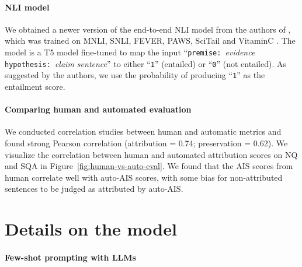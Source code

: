 \paragraph{NLI model} We obtained a newer version of the end-to-end NLI model from the authors of \citet{Honovich2022TRUERF}, which was trained on MNLI, SNLI, FEVER, PAWS, SciTail and VitaminC \cite{williams2017broad,bowman2015large,thorne2018fever,zhang2019paws,khot2018scitail,schuster2021get}.
The model is a T5 model fine-tuned to map the input ``\texttt{premise: }\textit{evidence}\texttt{ hypothesis:   }\textit{claim sentence}'' to either ``\texttt{1}'' (entailed) or ``\texttt{0}'' (not entailed). As suggested by the authors, we use the probability of producing ``\texttt{1}'' as the entailment score.



\paragraph{Comparing human and automated evaluation}
We conducted correlation studies between human and automatic metrics and found strong Pearson correlation (attribution = 0.74; preservation = 0.62).
We visualize the correlation between human and automated attribution scores on NQ and SQA in Figure~\ref{fig:human-vs-auto-eval}. We found that the AIS scores from human correlate well with auto-AIS scores, with some bias for non-attributed sentences to be judged as attributed by auto-AIS.



\section{Details on the model}
\label{app:model-details}

\paragraph{Few-shot prompting with LLMs} \label{section:prompting}

